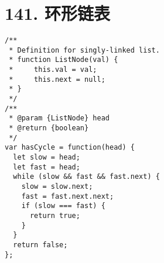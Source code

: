 \newpage
\section{141. 环形链表}
\label{leetcode:141}

\begin{verbatim}
/**
 * Definition for singly-linked list.
 * function ListNode(val) {
 *     this.val = val;
 *     this.next = null;
 * }
 */
/**
 * @param {ListNode} head
 * @return {boolean}
 */
var hasCycle = function(head) {
  let slow = head;
  let fast = head;
  while (slow && fast && fast.next) {
    slow = slow.next;
    fast = fast.next.next;
    if (slow === fast) {
      return true;
    }
  }
  return false;
};
\end{verbatim}
